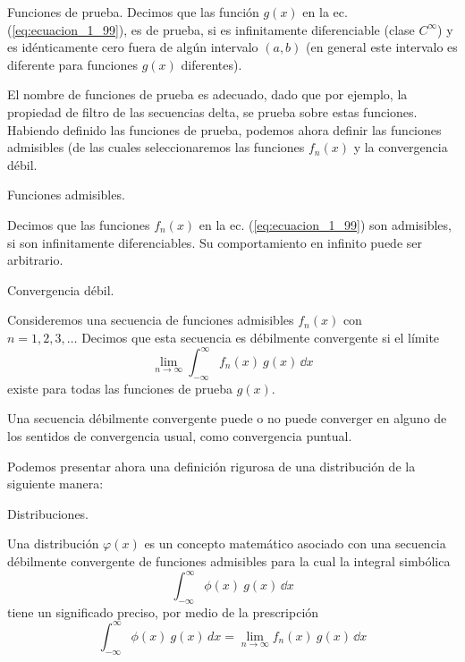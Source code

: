 \begin{defi}
Funciones de prueba.
Decimos que las función $g(x)$ en la ec. (\ref{eq:ecuacion_1_99}), es de prueba, si es infinitamente diferenciable (clase $C^{\infty}$) y es idénticamente cero fuera de algún intervalo $(a, b)$ (en general este intervalo es diferente para funciones $g(x)$ diferentes).
\end{defi}
El nombre de funciones de prueba es adecuado, dado que por ejemplo, la propiedad de filtro de las secuencias delta, se prueba sobre estas funciones. Habiendo definido las funciones de prueba, podemos ahora definir las funciones admisibles (de las cuales seleccionaremos las funciones $f_{n}(x)$ y la convergencia débil.
\begin{defi}
Funciones admisibles.

Decimos que las funciones $f_{n}(x)$ en la ec. (\ref{eq:ecuacion_1_99}) son admisibles, si son infinitamente diferenciables. Su comportamiento en infinito puede ser arbitrario.
\end{defi}
\begin{defi}
Convergencia débil.

Consideremos una secuencia de funciones admisibles $f_{n}(x)$ con \\ $n = 1, 2, 3, \ldots$
Decimos que esta secuencia es débilmente convergente si el límite
\begin{equation}
\lim_{n \to \infty} \int_{-\infty}^{\infty} f_{n}(x) \:  g(x) \, \dd{x}
\label{eq:ecuacion_1_100}
\end{equation}
existe para todas las funciones de prueba $g(x)$.
\end{defi}
Una secuencia débilmente convergente puede o no puede converger en alguno de los sentidos de convergencia usual, como convergencia puntual.
\par
Podemos presentar ahora una definición rigurosa de una distribución de la siguiente manera:
\begin{defi}
Distribuciones.

Una distribución $\varphi (x)$ es un concepto matemático asociado con una secuencia débilmente convergente de funciones admisibles para la cual la integral simbólica
\begin{equation}
\int_{-\infty}^{\infty} \phi (x) \:  g(x) \, \dd{x}
\label{eq:ecuacion_1_101}
\end{equation}
tiene un significado preciso, por medio de la prescripción
\begin{equation}
\int_{-\infty}^{\infty} \phi (x) \: g(x) \, dx = \lim_{n \to \infty} f_{n}(x) \: g(x) \, \dd{x}
\label{eq:ecuacion_1_102}
\end{equation}
\end{defi}
